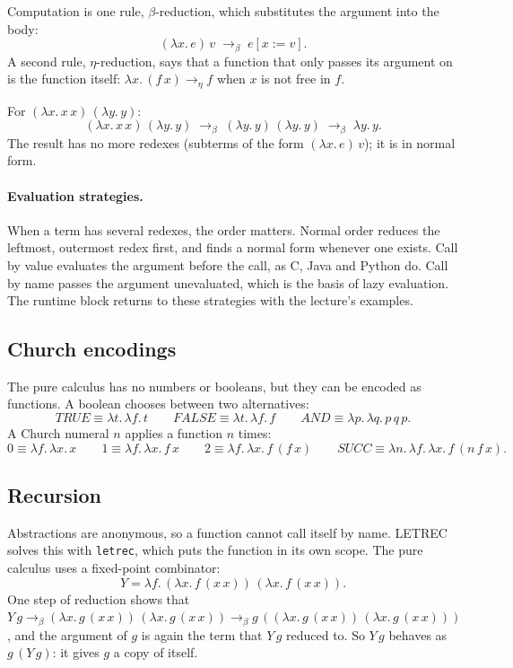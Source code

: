 Computation is one rule, $\beta$-reduction, which substitutes the argument into
the body:
\[
(\lambda x.\, e)\, v \;\to_\beta\; e[x := v].
\]
A second rule, $\eta$-reduction, says that a function that only passes its
argument on is the function itself: $\lambda x.\, (f\, x) \to_\eta f$ when $x$ is
not free in $f$.

For $(\lambda x.\, x\, x)\,(\lambda y.\, y)$:
\[
(\lambda x.\, x\, x)\,(\lambda y.\, y) \;\to_\beta\; (\lambda y.\, y)\,(\lambda y.\, y)
\;\to_\beta\; \lambda y.\, y.
\]
The result has no more redexes (subterms of the form $(\lambda x.\, e)\, v$); it is
in normal form.

\paragraph{Evaluation strategies.} When a term has several redexes, the order
matters. Normal order reduces the leftmost, outermost redex first, and finds
a normal form whenever one exists. Call by value evaluates the argument before
the call, as C, Java and Python do. Call by name passes the argument
unevaluated, which is the basis of lazy evaluation. The runtime block
returns to these strategies with the lecture's examples.

\subsection{Church encodings}

The pure calculus has no numbers or booleans, but they can be encoded as
functions. A boolean chooses between two alternatives:
\[
\mathit{TRUE} \equiv \lambda t.\, \lambda f.\, t \qquad
\mathit{FALSE} \equiv \lambda t.\, \lambda f.\, f \qquad
\mathit{AND} \equiv \lambda p.\, \lambda q.\, p\, q\, p.
\]
A Church numeral $n$ applies a function $n$ times:
\[
0 \equiv \lambda f.\, \lambda x.\, x \qquad
1 \equiv \lambda f.\, \lambda x.\, f\, x \qquad
2 \equiv \lambda f.\, \lambda x.\, f\,(f\, x) \qquad
\mathit{SUCC} \equiv \lambda n.\, \lambda f.\, \lambda x.\, f\,(n\, f\, x).
\]

\subsection{Recursion}

Abstractions are anonymous, so a function cannot call itself by name. LETREC
solves this with \texttt{letrec}, which puts the function in its own scope.
The pure calculus uses a fixed-point combinator:
\[
Y = \lambda f.\, (\lambda x.\, f\,(x\, x))\,(\lambda x.\, f\,(x\, x)).
\]
One step of reduction shows that $Y\, g \to_\beta (\lambda x.\, g\,(x\, x))\,(\lambda x.\, g\,(x\, x)) \to_\beta g\,((\lambda x.\, g\,(x\, x))\,(\lambda x.\, g\,(x\, x)))$,
and the argument of $g$ is again the term that $Y\, g$ reduced to. So
$Y\, g$ behaves as $g\,(Y\, g)$: it gives $g$ a copy of itself.

